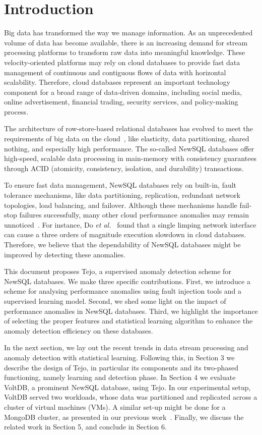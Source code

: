 \section{Introduction}

Big data has transformed the way we manage information. As an unprecedented volume of data has become available, there is an increasing demand for stream processing platforms to transform raw data into meaningful knowledge. These velocity-oriented platforms may rely on cloud databases to provide fast data management of continuous and contiguous flows of data with horizontal scalability. Therefore, cloud databases represent an important technology component for a broad range of data-driven domains, including social media, online advertisement, financial trading, security services, and policy-making process.

The architecture of row-store-based relational databases has evolved to meet the requirements of big data on the cloud~\cite{ren2012lightweight}, like elasticity, data partitioning, shared nothing, and especially high performance. The so-called NewSQL databases offer high-speed, scalable data processing in main-memory with consistency guarantees through ACID (atomicity, consistency, isolation, and durability) transactions.

To ensure fast data management, NewSQL databases rely on built-in, fault tolerance mechanisms, like data partitioning, replication, redundant network topologies, load balancing, and failover. Although these mechanisms handle fail-stop failures successfully, many other cloud performance anomalies may remain unnoticed~\cite{server_delays}. For instance, Do \emph{et al.}~\cite{do2013limplock} found that a single limping network interface can cause a three orders of magnitude execution slowdown in cloud databases. Therefore, we believe that the dependability of NewSQL databases might be improved by detecting these anomalies. 

This document proposes Tejo, a supervised anomaly detection scheme for NewSQL databases. We make three specific contributions. First, we introduce a scheme for analysing performance anomalies using fault injection tools and a supervised learning model. Second, we shed some light on the impact of performance anomalies in NewSQL databases. Third, we highlight the importance of selecting the proper features and statistical learning algorithm to enhance the anomaly detection efficiency on these databases.

In the next section, we lay out the recent trends in data stream processing and anomaly detection with statistical learning. Following this, in Section 3 we describe the design of Tejo, in particular its components and its two-phased functioning, namely learning and detection phase. In Section 4 we evaluate VoltDB, a prominent NewSQL database, using Tejo. In our experimental setup, VoltDB served two workloads, whose data was partitioned and replicated across a cluster of virtual machines (VMs). A similar set-up might be done for a MongoDB cluster, as presented in our previous work~\cite{silvestre2014anomaly}. Finally, we discuss the related work in Section 5, and conclude in Section 6.


